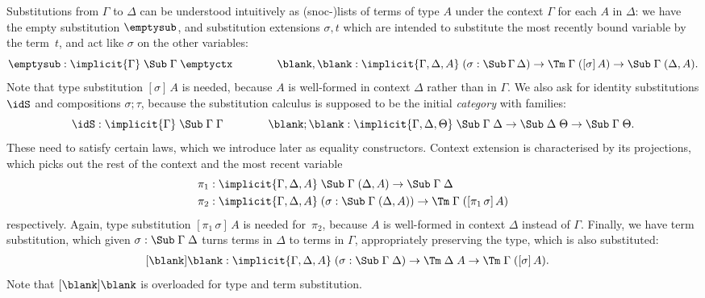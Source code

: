 \documentclass[a4paper,UKenglish,numberwithinsect,cleveref,thm-restate]{lipics-v2021}
\begin{document}
Substitutions from $\Gamma$ to $\Delta$ can be understood intuitively as (snoc-)lists of terms of type $A$ under the context $\Gamma$ for each $A$ in $\Delta$: we have the empty substitution $\emptysub$, and substitution extensions $\sigma, t$ which are intended to substitute the most recently bound variable by the term~$t$, and act like $\sigma$ on the other variables:
\[
  \emptysub : \implicit{\Gamma}\;\Sub\;\Gamma\;\emptyctx
  \qquad\qquad
  \blank,\blank : \implicit{\Gamma, \Delta, A}\; (\sigma : \Sub\,\Gamma\,\Delta) \to \Tm\;\Gamma\;([ \sigma ]\, A) \to \Sub\;\Gamma\;(\Delta, A).
\]
Note that type substitution $[\sigma]\,A$ is needed, because $A$ is well-formed in context $\Delta$ rather than in $\Gamma$.
We also ask for identity substitutions $\idS$ and compositions $\sigma;\tau$, because the substitution calculus is supposed to be the initial \emph{category} with families:
\[
  \idS : \implicit{\Gamma}\; \Sub\;\Gamma\;\Gamma
  \qquad\qquad \blank;\blank : \implicit{\Gamma, \Delta, \Theta}\;\Sub\;\Gamma\;\Delta \to \Sub\;\Delta\;\Theta \to \Sub\;\Gamma\;\Theta.
\]
These need to satisfy certain laws, which we introduce later as equality constructors.
Context extension is characterised by its projections, which picks out the rest of the context and the most recent variable
\begin{alignat*}{3}
  \pi_1 & : \implicit{\Gamma, \Delta, A}\;\Sub\;\Gamma\;(\Delta, A) \to \Sub\;\Gamma\;\Delta \\
  \pi_2 & : \implicit{\Gamma, \Delta, A}\;(\sigma : \Sub\;\Gamma\;(\Delta, A)) \to \Tm\;\Gamma\;([ \pi_1\,\sigma ]\, A)
\end{alignat*}
respectively.
Again, type substitution $[\pi_1\,\sigma]\,A$ is needed for~$\pi_2$, because $A$ is well-formed in context $\Delta$ instead of $\Gamma$.
Finally, we have term substitution, which given $\sigma : \Sub\;\Gamma\;\Delta$ turns terms in $\Delta$ to terms in $\Gamma$, appropriately preserving the type, which is also substituted:
\begin{alignat*}{3}
  [\blank] \blank & : \implicit{\Gamma,\Delta, A}\;(\sigma : \Sub\;\Gamma\;\Delta) \to \Tm\;\Delta\;A \to \Tm\;\Gamma\;([\sigma]\, A).
\end{alignat*}
Note that $[\blank]\blank$ is overloaded for type and term substitution.
\end{document}

